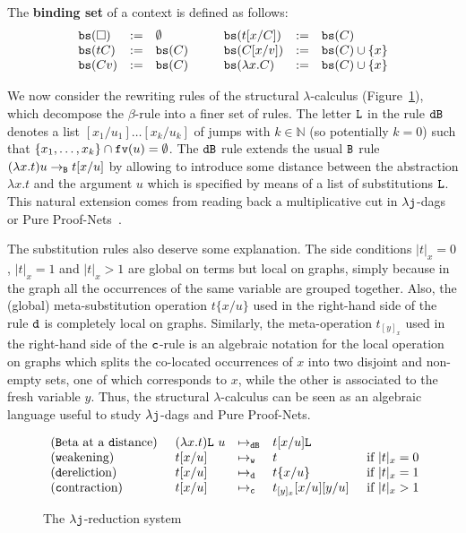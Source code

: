 \documentclass{LMCS}
\newcommand{\sep}{\hspace*{0.5cm}}
\renewcommand{\>}{\rightarrow}
\def\lam{\lambda}
\newcommand{\Rew}[1]{\rightarrow_{#1}}
\newcommand{\rRew}[1]{\mapsto_{#1}}
\newcommand{\isubs}[1]{ \{ #1  \} }
\newcommand{\nat}{{\mathbb N}}
\newcommand{\B}{{\tt dB}}
\newcommand{\dis}{{\tt j}}
\newcommand{\ldis}{\lam{\dis}}
\newcommand{\lj}{\lam{\dis}}
\newcommand{\fv}[1]{{\tt fv}(#1)}
\newcommand{\Var}{{\tt d}}
\newcommand{\DSubs}{{\tt c}}
\newcommand{\Gc}{{\tt w}}
\newcommand{\set}[1]{ \{ #1 \}}
\newcommand{\ems}{\emptyset}
\newcommand{\deft}[1]{{\bf #1}}
\newcommand{\slist}{{\tt L}}
\newcommand{\bs}[1]{{\tt bs}(#1)}
\newcommand{\List}{{\tt L}}
\newcommand{\hole}{\Box}
\begin{document}
The  \deft{binding set} of a context 
is defined as follows: 
\[ \begin{array}{lll@{\sep\sep}lll}
\bs{\hole}&:=&\ems & 
\bs{t{[}x/C{]}}&:=&\bs{C}\\
\bs{t C}&:=&\bs{C} & 
\bs{C[x/v]}&:=& \bs{C}\cup\set{x} \\
\bs{C v}&:=&\bs{C} & 
\bs{\lam x. C}&:=&\bs{C}\cup\set{x}\\
\end{array}\] 


We now consider the
rewriting rules of the structural $\lam$-calculus
(Figure~\ref{f:lambdaj}), which decompose the $\beta$-rule into a
finer set of rules. The letter $\List$ in the rule $\B$
  denotes a list $[x_1/u_1]\ldots[x_k/u_k]$ of jumps with
  $k\in\nat$ (so potentially $k=0$) such that $\set{x_1, \ldots, x_k}
  \cap \fv{u} = \ems$.  The $\B$ rule extends the usual ${\tt B}$ rule
  $(\lam x.t) u \Rew{\tt B} t[x/u]$ by allowing to introduce some
  distance between the abstraction $\lam x. t$ and the argument $u$
  which is specified by means of a list of substitutions
  $\slist$. This natural extension comes from reading back a
  multiplicative cut in $\lj$-dags or Pure
  Proof-Nets~\cite{AG09,AccattoliTh}.

The substitution
  rules also deserve some explanation. The side conditions $|t|_x=0$,
  $|t|_x=1$ and $|t|_x>1$ are global on terms but local on graphs,
  simply because in the graph all the occurrences of the same variable are grouped
  together.  Also, the (global) meta-substitution
  operation $t\isubs{x/u}$ used in the right-hand side of the rule
  $\Var$ is completely local on graphs. Similarly, the meta-operation
  $t_{[y]_x}$ used in the right-hand side of the $\DSubs$-rule is an
  algebraic notation for the local operation on graphs which splits  the co-located
  occurrences of $x$ into two disjoint and
  non-empty sets, one of which corresponds  to $x$, while the other is associated to
  the fresh variable $y$. Thus, the structural
$\lam$-calculus can be seen as an algebraic language useful to study
$\lj$-dags and Pure Proof-Nets. 

\begin{figure}[ht]
\[\begin{array}{l@{\sep}lll@{\sep}l}
(\mbox{{\tt B}eta at a {\tt d}istance}) & (\lam x.t)\List\ u & \rRew{\B}&  t[x/u]\List    \\
(\mbox{{\tt w}eakening}) & t[x/u] & \rRew{\Gc} & t &\mbox{if $|t|_x=0$}\\
(\mbox{{\tt d}ereliction}) & t[x/u] & \rRew{\Var} & t\set{x/u} &\mbox{if $|t|_x=1$}\\
(\mbox{{\tt c}ontraction}) & t[x/u] & \rRew{\DSubs} & t_{[y]_x}[x/u][y/u] &\mbox{if $|t|_x>1$}\\
  \end{array}\]
\caption{The $\ldis$-reduction system}
\label{f:lambdaj}
\end{figure}
\end{document}
